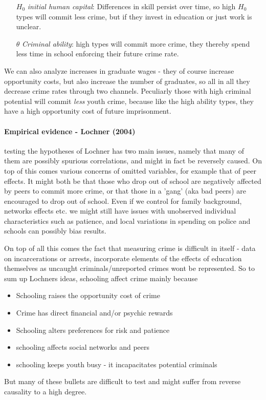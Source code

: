 \documentclass[12pt, a4paper]{article}
\begin{document}
\begin{multicols}{2}
\begin{itemize}
\item[$H_0$] \textit{initial human capital}: Differences in skill persist over time, so high $H_0$ types will commit less crime, but if they invest in education or just work is unclear.
\item[$\theta$] \textit{Criminal ability}: high types will commit more crime, they thereby spend less time in school enforcing their future crime rate.
\end{itemize}
We can also analyze increases in graduate wages - they of course increase opportunity costs, but also increase the number of graduates, so all in all they decrease crime rates through two channels. Peculiarly those with high criminal potential will commit \textit{less} youth crime, because like the high ability types, they have a high opportunity cost of future imprisonment. 

\paragraph{Empirical evidence - Lochner (2004)} testing the hypotheses of Lochner has two main issues, namely that many of them are possibly spurious correlations, and might in fact be reversely caused. On top of this comes various concerns of omitted variables, for example that of peer effects. It might both be that those who drop out of school are negatively affected by peers to commit more crime, or that those in a 'gang' (aka bad peers) are encouraged to drop out of school. Even if we control for family background, networks effects etc. we might still have issues with unobserved individual characteristics such as patience, and local variations in spending on police and schools can possibly bias results. 

On top of all this comes the fact that measuring crime is difficult in itself - data on incarcerations or arrests, incorporate elements of the effects of education themselves as uncaught criminals/unreported crimes wont be represented. So to sum up Lochners ideas, schooling affect crime mainly because
\begin{itemize}
\item Schooling raises the opportunity cost of crime
\item Crime has direct financial and/or psychic rewards
\item Schooling alters preferences for risk and patience
\item schooling affects social networks and peers
\item schooling keeps youth busy - it incapacitates potential criminals
\end{itemize}
But many of these bullets are difficult to test and might suffer from reverse causality to a high degree. 


\end{multicols}
\end{document}
